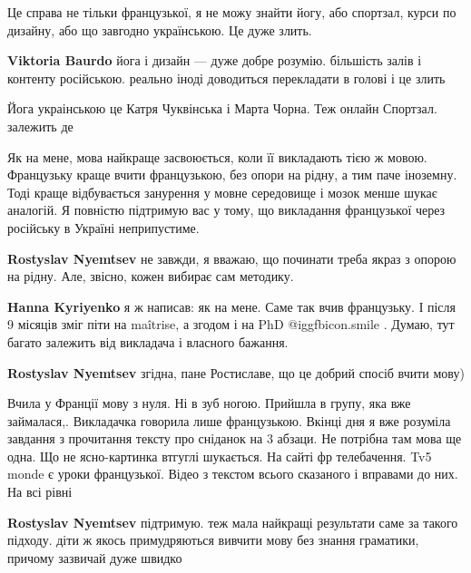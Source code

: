 \begin{itemize}

Це справа не тільки французької, я не можу знайти йогу, або спортзал, курси по
дизайну, або що завгодно українською. Це дуже злить.

\begin{itemize} %
\textbf{Viktoria Baurdo} йога і дизайн — дуже добре розумію. більшість залів і контенту російською. реально іноді доводиться перекладати в голові і це злить

Йога украінською це Катря Чуквінська і Марта Чорна. Теж онлайн
Спортзал. залежить де
\end{itemize} %


Як на мене, мова найкраще засвоюється, коли її викладають тією ж мовою.
Французьку краще вчити французькою, без опори на рідну, а тим паче іноземну.
Тоді краще відбувається занурення у мовне середовище і мозок менше шукає
аналогій. Я повністю підтримую вас у тому, що викладання французької через
російську в Україні неприпустиме.

\begin{itemize} %
\textbf{Rostyslav Nyemtsev} не завжди, я вважаю, що починати треба якраз з опорою на рідну. Але, звісно, кожен вибирає сам методику.

\textbf{Hanna Kyriyenko} я ж написав: як на мене. Саме так вчив французьку. І після 9 місяців зміг піти на maîtrise, а згодом і на PhD  @igg{fbicon.smile} . Думаю, тут багато залежить від викладача і власного бажання.

\textbf{Rostyslav Nyemtsev} згідна, пане Ростиславе, що це добрий спосіб вчити мову)

Вчила у Франції мову з нуля. Ні в зуб ногою. Прийшла в групу, яка вже займалася,. Викладачка говорила лише французькою. Вкінці дня я вже розуміла завдання з прочитання тексту про сніданок на 3 абзаци. Не потрібна там мова ще одна. Що не ясно-картинка втгуглі шукається.
На сайті фр телебачення. Tv5 monde є уроки французької. Відео з текстом всього сказаного і вправами до них. На всі рівні

\textbf{Rostyslav Nyemtsev} підтримую. теж мала найкращі результати саме за такого підходу. діти ж якось примудряються вивчити мову без знання граматики, причому зазвичай дуже швидко
\end{itemize} %


\end{itemize}
